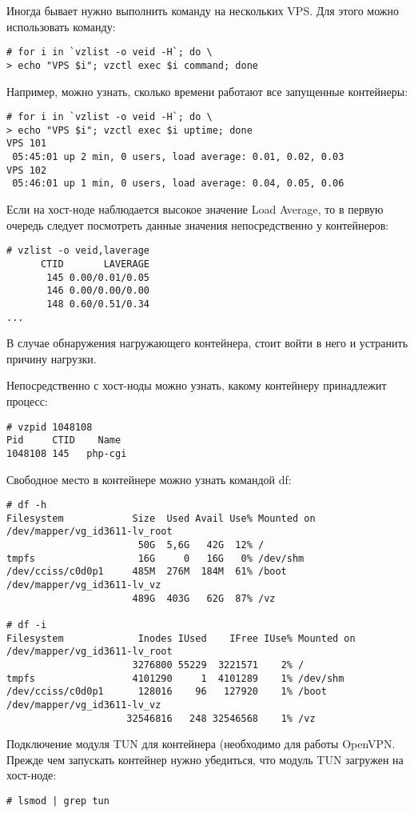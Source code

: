 Иногда бывает нужно выполнить команду на нескольких VPS.
Для этого можно использовать команду:
\begin{lstlisting}
# for i in `vzlist -o veid -H`; do \
> echo "VPS $i"; vzctl exec $i command; done
\end{lstlisting}

Например, можно узнать, сколько времени работают все запущенные контейнеры:
\begin{lstlisting}
# for i in `vzlist -o veid -H`; do \
> echo "VPS $i"; vzctl exec $i uptime; done
VPS 101
 05:45:01 up 2 min, 0 users, load average: 0.01, 0.02, 0.03
VPS 102
 05:46:01 up 1 min, 0 users, load average: 0.04, 0.05, 0.06
\end{lstlisting}

Если на хост-ноде наблюдается высокое значение Load Average, то в первую очередь следует посмотреть данные значения непосредственно у контейнеров:
\begin{lstlisting}
# vzlist -o veid,laverage
      CTID       LAVERAGE
       145 0.00/0.01/0.05
       146 0.00/0.00/0.00
       148 0.60/0.51/0.34
...
\end{lstlisting}

В случае обнаружения нагружающего контейнера, стоит войти в него и устранить причину нагрузки.

Непосредственно с хост-ноды можно узнать, какому контейнеру принадлежит процесс:
\begin{lstlisting}
# vzpid 1048108
Pid	    CTID	Name
1048108	145	  php-cgi
\end{lstlisting}

Свободное место в контейнере можно узнать командой df:
\begin{lstlisting}
# df -h
Filesystem            Size  Used Avail Use% Mounted on
/dev/mapper/vg_id3611-lv_root
                       50G  5,6G   42G  12% /
tmpfs                  16G     0   16G   0% /dev/shm
/dev/cciss/c0d0p1     485M  276M  184M  61% /boot
/dev/mapper/vg_id3611-lv_vz
                      489G  403G   62G  87% /vz

# df -i
Filesystem             Inodes IUsed    IFree IUse% Mounted on
/dev/mapper/vg_id3611-lv_root
                      3276800 55229  3221571    2% /
tmpfs                 4101290     1  4101289    1% /dev/shm
/dev/cciss/c0d0p1      128016    96   127920    1% /boot
/dev/mapper/vg_id3611-lv_vz
                     32546816   248 32546568    1% /vz
\end{lstlisting}

Подключение модуля TUN для контейнера (необходимо для работы OpenVPN.
Прежде чем запускать контейнер нужно убедиться, что модуль TUN загружен на хост-ноде:
\begin{lstlisting}
# lsmod | grep tun
\end{lstlisting}

